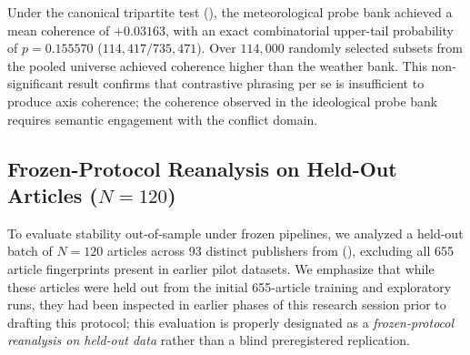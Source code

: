 Under the canonical tripartite test (), the meteorological probe bank achieved a mean coherence of $+0.03163$, with an exact combinatorial upper-tail probability of $p = 0.155570$ ($114{,}417 / 735{,}471$). Over $114{,}000$ randomly selected subsets from the pooled universe achieved coherence higher than the weather bank. This non-significant result confirms that contrastive phrasing per se is insufficient to produce axis coherence; the coherence observed in the ideological probe bank requires semantic engagement with the conflict domain.

\subsection{Frozen-Protocol Reanalysis on Held-Out Articles ($N=120$)}
\label{sec:fresh_unseen_results}

To evaluate stability out-of-sample under frozen pipelines, we analyzed a held-out batch of $N=120$ articles across 93 distinct publishers from  (), excluding all 655 article fingerprints present in earlier pilot datasets. We emphasize that while these articles were held out from the initial 655-article training and exploratory runs, they had been inspected in earlier phases of this research session prior to drafting this protocol; this evaluation is properly designated as a \emph{frozen-protocol reanalysis on held-out data} rather than a blind preregistered replication.

